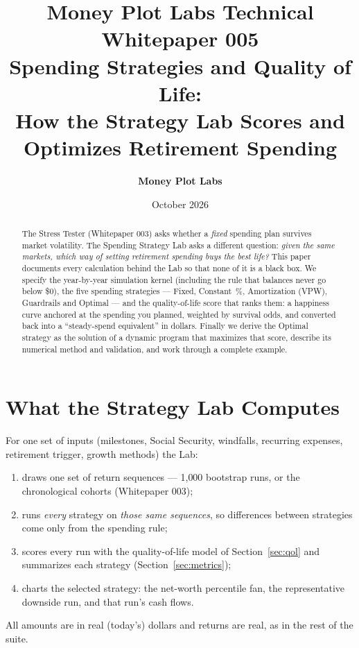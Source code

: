 \documentclass[11pt,letterpaper]{article}
\title{\vspace{-20pt}\textbf{\color{mpdark}Money Plot Labs Technical Whitepaper 005 \\
Spending Strategies and Quality of Life: \\
How the Strategy Lab Scores and Optimizes Retirement Spending}}
\author{\textbf{Money Plot Labs}}
\date{October 2026}
\begin{document}
\maketitle

\begin{abstract}
\vspace{-5pt}
The Stress Tester (Whitepaper 003) asks whether a \emph{fixed} spending plan survives market volatility. The Spending Strategy Lab asks a different question: \emph{given the same markets, which way of setting retirement spending buys the best life?} This paper documents every calculation behind the Lab so that none of it is a black box. We specify the year-by-year simulation kernel (including the rule that balances never go below \$0), the five spending strategies --- Fixed, Constant~\%, Amortization (VPW), Guardrails and Optimal --- and the quality-of-life score that ranks them: a happiness curve anchored at the spending you planned, weighted by survival odds, and converted back into a ``steady-spend equivalent'' in dollars. Finally we derive the Optimal strategy as the solution of a dynamic program that maximizes that score, describe its numerical method and validation, and work through a complete example.
\end{abstract}

\section{What the Strategy Lab Computes}

For one set of inputs (milestones, Social Security, windfalls, recurring expenses, retirement trigger, growth methods) the Lab:
\begin{enumerate}
\setlength\itemsep{1pt}
\item draws one set of return sequences --- 1{,}000 bootstrap runs, or the chronological cohorts (Whitepaper 003);
\item runs \emph{every} strategy on \emph{those same sequences}, so differences between strategies come only from the spending rule;
\item scores every run with the quality-of-life model of Section~\ref{sec:qol} and summarizes each strategy (Section~\ref{sec:metrics});
\item charts the selected strategy: the net-worth percentile fan, the representative downside run, and that run's cash flows.
\end{enumerate}
All amounts are in real (today's) dollars and returns are real, as in the rest of the suite.
\end{document}
